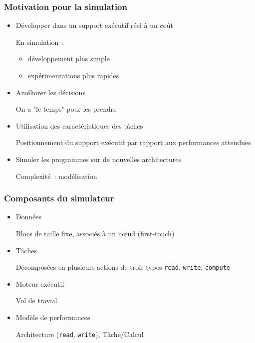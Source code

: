 \documentclass[xcolor={usenames,dvipsnames,svgnames,table}, aspectratio=43]{beamer}
\renewcommand{\emph}[1]{{\usebeamercolor[fg]{titlelike}#1}}
\begin{document}
\begin{frame}[fragile]
  \frametitle{Motivation pour la simulation}

  \begin{itemize}
    \item Développer dans un support exécutif réel à un coût

      En simulation~:
      \begin{itemize}
	\item développement plus simple
	\item expérimentations plus rapides
      \end{itemize}

    \item Améliorer les décisions

      On a "le temps" pour les prendre

    \item Utilisation des caractéristiques des tâches

      Positionnement du support exécutif par rapport aux performances attendues

    \item Simuler les programmes sur de nouvelles architectures

      Complexité~: modélisation
  \end{itemize}


\end{frame}

\begin{frame}[fragile]
  \frametitle{Composants du simulateur}
  \begin{itemize}
    \item Données

      Blocs de taille fixe, associés à un nœud (\emph{first-touch})

    \item Tâches

      Décomposées en plusieurs actions de trois types \verb/read/, \verb/write/, \verb/compute/

    \item Moteur exécutif

      Vol de travail

    \item Modèle de performances

      Architecture (\verb/read/, \verb/write/), Tâche/Calcul
  \end{itemize}

\end{frame}
\end{document}
